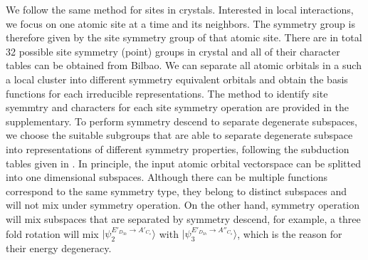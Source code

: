 \documentclass{article}
\begin{document}
We follow the same method for sites in crystals. Interested in local interactions, we focus on one atomic site at a time and its neighbors. 
The symmetry group is therefore given by the site symmetry group of that atomic site. 
There are in total 32 possible site symmetry (point) groups in crystal and all of their character tables can be obtained from Bilbao. 
We can separate all atomic orbitals in a such a local cluster into different symmetry equivalent orbitals and obtain the basis functions 
for each irreducible representations. 
The method to identify site syemmtry and characters for each site symmetry operation are provided in the supplementary. 
To perform symmetry descend to separate degenerate subspaces, we choose the suitable subgroups that are able to separate degenerate 
subspace into representations of different symmetry properties, following the subduction tables 
given in \cite{altmann_point-group_1994}. In principle, the input atomic orbital vectorspace can be splitted into 
one dimensional subspaces. Although there can be multiple functions correspond to the same symmetry type, they belong to distinct 
subspaces and will not mix under symmetry operation. On the other hand, symmetry operation will mix subspaces that are separated 
by symmetry descend, for example, a three fold rotation will mix $|\psi_2^{E'_{D_{3h}}\to A'_{C_s}} \rangle$ with 
$|\psi_3^{E'_{D_{3h}}\to A''_{C_s}}\rangle$, which is the reason for their energy degeneracy.
\end{document}
